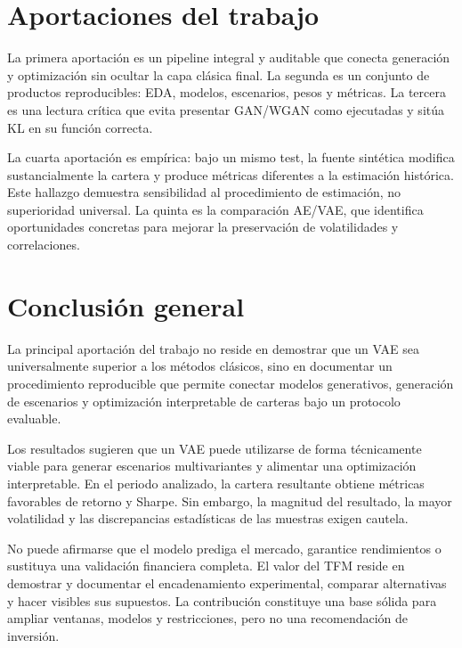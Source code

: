 \section{Aportaciones del trabajo}

La primera aportación es un pipeline integral y auditable que conecta generación y optimización sin ocultar la capa clásica final. La segunda es un conjunto de productos reproducibles: EDA, modelos, escenarios, pesos y métricas. La tercera es una lectura crítica que evita presentar GAN/WGAN como ejecutadas y sitúa KL en su función correcta.

La cuarta aportación es empírica: bajo un mismo test, la fuente sintética modifica sustancialmente la cartera y produce métricas diferentes a la estimación histórica. Este hallazgo demuestra sensibilidad al procedimiento de estimación, no superioridad universal. La quinta es la comparación AE/VAE, que identifica oportunidades concretas para mejorar la preservación de volatilidades y correlaciones.

\section{Conclusión general}

La principal aportación del trabajo no reside en demostrar que un VAE sea universalmente superior a los métodos clásicos, sino en documentar un procedimiento reproducible que permite conectar modelos generativos, generación de escenarios y optimización interpretable de carteras bajo un protocolo evaluable.

Los resultados sugieren que un VAE puede utilizarse de forma técnicamente viable para generar escenarios multivariantes y alimentar una optimización interpretable. En el periodo analizado, la cartera resultante obtiene métricas favorables de retorno y Sharpe. Sin embargo, la magnitud del resultado, la mayor volatilidad y las discrepancias estadísticas de las muestras exigen cautela.

No puede afirmarse que el modelo prediga el mercado, garantice rendimientos o sustituya una validación financiera completa. El valor del TFM reside en demostrar y documentar el encadenamiento experimental, comparar alternativas y hacer visibles sus supuestos. La contribución constituye una base sólida para ampliar ventanas, modelos y restricciones, pero no una recomendación de inversión.
